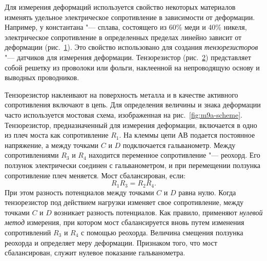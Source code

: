 \documentclass[a4paper, 12pt]{extarticle}
\begin{document}
\begin{figure}[h]
\begin{center}
\end{center}
\caption{\label{fig:m9a-resistance}}
\end{figure}

\begin{figure}[h]
\begin{center}
\end{center}
\caption{\label{fig:m9a-resistive-strain-sensor}}
\end{figure}

Для измерения деформаций используется свойство некоторых материалов изменять удельное электрическое сопротивление в зависимости от деформации. Например, у константана "--- сплава, состоящего из 60\% меди и 40\% никеля, электрическое сопротивление в определенных пределах линейно зависит от деформации (рис.~\ref{fig:m9a-resistance}). Это свойство использовано для создания \emph{тензорезисторов} "--- датчиков для измерения деформации. Тензорезистор (рис.~\ref{fig:m9a-resistive-strain-sensor}) представляет собой решетку из проволоки или фольги, наклеенной на непроводящую основу и выводных проводников.

Тензорезистор наклеивают на поверхность металла и в качестве активного сопротивления включают в цепь. Для определения величины и знака деформации часто используется мостовая схема, изображенная на рис.~\ref{fig:m9a-scheme}. Тензорезистор, предназначенный для измерения деформации, включается в одно из плеч моста как сопротивление $R_1$. На клеммы цепи $АВ$ подается постоянное напряжение, а между точками $C$ и $D$ подключается гальванометр. Между сопротивлениями $R_3$ и $R_4$ находится переменное сопротивление "--- реохорд. Его ползунок электрически соединен с гальванометром, и при перемещении ползунка сопротивление плеч меняется. Мост сбалансирован, если:
\begin{equation}
\label{eq:m9a-resistance}
R_1 R_3 = R_2 R_4.
\end{equation}
При этом разность потенциалов между точками $C$ и $D$ равна нулю. Когда тензорезистор под действием нагрузки изменяет свое сопротивление, между точками $C$ и $D$ возникает разность потенциалов. Как правило, применяют \emph{нулевой метод} измерения, при котором мост сбалансируется вновь путем изменения сопротивлений $R_3$ и $R_4$ с помощью реохорда. Величина смещения ползунка реохорда и определяет меру деформации. Признаком того, что мост сбалансирован, служит нулевое показание гальванометра.
\end{document}
